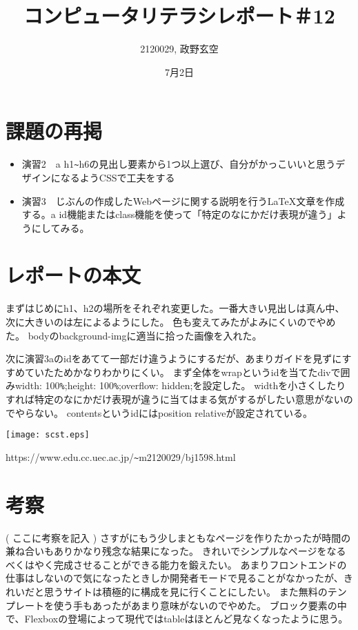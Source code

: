 \documentclass[12pt,a4j]{jarticle}
\begin{document}
\title{コンピュータリテラシレポート＃12}
\author{2120029, 政野玄空}
\date{7月2日}
\maketitle


\section{課題の再掲}
\begin{itemize}
  \item 演習2　a h1\verb|~|h6の見出し要素から1つ以上選び、自分がかっこいいと思うデザインになるようCSSで工夫をする
  \item 演習3　じぶんの作成したWebページに関する説明を行うLaTeX文章を作成する。a id機能またはclass機能を使って「特定のなにかだけ表現が違う」ようにしてみる。
\end{itemize}

\section{レポートの本文}

まずはじめにh1、h2の場所をそれぞれ変更した。一番大きい見出しは真ん中、次に大きいのは左によるようにした。
色も変えてみたがよみにくいのでやめた。
bodyのbackground-imgに適当に拾った画像を入れた。

次に演習3aのidをあてて一部だけ違うようにするだが、あまりガイドを見ずにすすめていたためかなりわかりにくい。
まず全体をwrapというidを当てたdivで囲みwidth: 100\verb|%|;height: 100\verb|%|;overflow: hidden;を設定した。
widthを小さくしたりすれば特定のなにかだけ表現が違うに当てはまる気がするがしたい意思がないのでやらない。
contentsというidにはposition relativeが設定されている。

\begin{center}
  \texttt{[image: scst.eps]}
\end{center}


https://www.edu.cc.uec.ac.jp/\verb|~|m2120029/bj1598.html

\section{考察}
( ここに考察を記入 )
さすがにもう少しまともなページを作りたかったが時間の兼ね合いもありかなり残念な結果になった。
きれいでシンプルなページをなるべくはやく完成させることができる能力を鍛えたい。
あまりフロントエンドの仕事はしないので気になったときしか開発者モードで見ることがなかったが、きれいだと思うサイトは積極的に構成を見に行くことにしたい。
また無料のテンプレートを使う手もあったがあまり意味がないのでやめた。
ブロック要素の中で、Flexboxの登場によって現代ではtableはほとんど見なくなったように思う。
\end{document}

